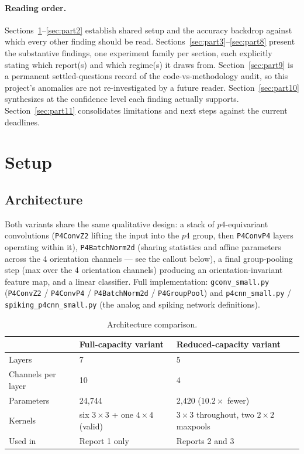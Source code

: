 \documentclass[11pt]{article}
\begin{document}
\paragraph{Reading order.} Sections~\ref{sec:part1}--\ref{sec:part2} establish shared setup and the
accuracy backdrop against which every other finding should be read. Sections~\ref{sec:part3}--\ref{sec:part8}
present the substantive findings, one experiment family per section, each explicitly stating which
report(s) and which regime(s) it draws from. Section~\ref{sec:part9} is a permanent settled-questions
record of the code-vs-methodology audit, so this project's anomalies are not re-investigated by a future
reader. Section~\ref{sec:part10} synthesizes at the confidence level each finding actually supports.
Section~\ref{sec:part11} consolidates limitations and next steps against the current deadlines.

\FloatBarrier

\section{Setup}
\label{sec:part1}

\subsection{Architecture}

Both variants share the same qualitative design: a stack of $p4$-equivariant convolutions
(\texttt{P4ConvZ2} lifting the input into the $p4$ group, then \texttt{P4ConvP4} layers operating within
it), \texttt{P4BatchNorm2d} (sharing statistics and affine parameters across the 4 orientation channels
--- see the callout below), a final group-pooling step (max over the 4 orientation channels) producing
an orientation-invariant feature map, and a linear classifier. Full implementation:
\texttt{gconv\_small.py} (\texttt{P4ConvZ2} / \texttt{P4ConvP4} / \texttt{P4BatchNorm2d} /
\texttt{P4GroupPool}) and \texttt{p4cnn\_small.py} / \texttt{spiking\_p4cnn\_small.py} (the analog and
spiking network definitions).

\begin{table}[H]
\centering
\begin{tabular}{@{}lll@{}}
\toprule
 & \textbf{Full-capacity variant} & \textbf{Reduced-capacity variant} \\
\midrule
Layers & 7 & 5 \\
Channels per layer & 10 & 4 \\
Parameters & 24{,}744 & 2{,}420 ($10.2\times$ fewer) \\
Kernels & six $3\times3$ + one $4\times4$ (valid) & $3\times3$ throughout, two $2\times2$ maxpools \\
Used in & Report 1 only & Reports 2 and 3 \\
\bottomrule
\end{tabular}
\caption{Architecture comparison.}
\end{table}
\end{document}
